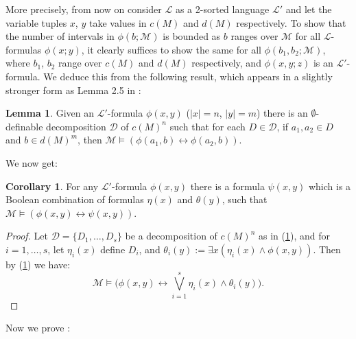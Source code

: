 \documentclass[a4paper]{report}
\newcommand{\ind}{\hspace{15pt}}
\newcommand{\D}{\mathcal{D}}
\renewcommand{\L}{\mathcal{L}}
\newcommand{\M}{\mathcal{M}}
\newcommand{\siff}{\leftrightarrow}
\theoremstyle{definition}
\newtheorem{lem}[thm]{Lemma}
\newtheorem{cor}[thm]{Corollary}
\theoremstyle{remstyle}
\begin{document}
\ind More precisely, from now on consider $\L$ as a 2-sorted language $\L'$ and let the variable tuples $x$, $y$ take values in $c(M)$ and $d(M)$ respectively. To show that the number of intervals in $\phi(b;\M)$ is bounded as $b$ ranges over $\M$ for all $\L$-formulas $\phi(x;y)$, it clearly suffices to show the same for all $\phi(b_1,b_2;\M)$, where $b_1$, $b_2$ range over $c(M)$ and $d(M)$ respectively, and $\phi(x,y;z)$ is an $\L'$-formula. We deduce this from the following result, which appears in a slightly stronger form as Lemma 2.5 in \cite{defIII}:

\begin{lem}\label{mixed2}
	Given an $\L'$-formula $\phi(x,y)$ ($|x|=n$, $|y|=m$) there is an $\emptyset$-definable decomposition $\D$ of $c(M)^n$ such that for each $D\in\D$, if $a_1,a_2\in D$ and $b\in d(M)^m$, then $\M\models(\phi(a_1,b)\siff\phi(a_2,b))$.
\end{lem}

\ind We now get:

\begin{cor}\label{mixed3}
	For any $\L'$-formula $\phi(x,y)$ there is a formula $\psi(x,y)$ which is a Boolean combination of formulas $\eta(x)$ and $\theta(y)$, such that $\M\models(\phi(x,y)\siff\psi(x,y))$.
\end{cor}

\begin{proof}
	Let $\D=\{D_1,\ldots,D_s\}$ be a decomposition of $c(M)^n$ as in (\ref{mixed2}), and for $i=1,\ldots,s$, let $\eta_i(x)$ define $D_i$, and $\theta_i(y):=\exists x(\eta_i(x)\wedge\phi(x,y))$. Then by (\ref{mixed2}) we have:
	\begin{equation*}
		\M\models\bigg(\phi(x,y)\siff\bigvee_{i=1}^s\eta_i(x)\wedge\theta_i(y)\bigg).
	\end{equation*}
\end{proof}

\ind Now we prove :
\end{document}
